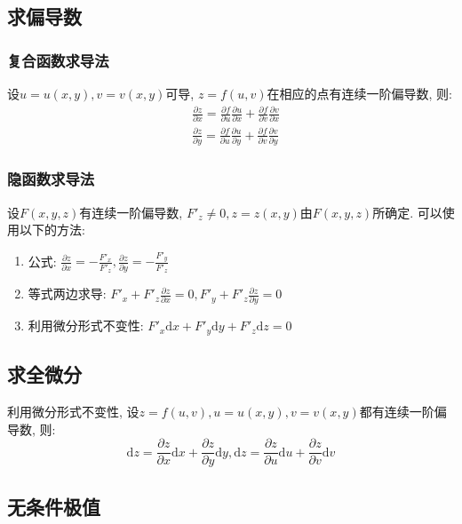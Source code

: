 \subsection{求偏导数}
\subsubsection{复合函数求导法}
设$ u=u(x,y),v=v(x,y) $可导, $ z=f(u,v) $在相应的点有连续一阶偏导数, 则:
\begin{equation*}
\begin{aligned}
& \frac{\partial z}{\partial x}=\frac{\partial f}{\partial u}\frac{\partial u}{\partial x}+\frac{\partial f}{\partial v}\frac{\partial v}{\partial x} \\
& \frac{\partial z}{\partial y}=\frac{\partial f}{\partial u}\frac{\partial u}{\partial y}+\frac{\partial f}{\partial v}\frac{\partial v}{\partial y}
\end{aligned}
\end{equation*}
\subsubsection{隐函数求导法}
设$ F(x,y,z) $有连续一阶偏导数, $ F'_{z}\neq 0, z=z(x,y) $由$ F(x,y,z) $所确定. 可以使用以下的方法:
\begin{enumerate}
\item 公式: $ \frac{\partial z}{\partial x}=-\frac{F'_{x}}{F'_{z}}, \frac{\partial z}{\partial y}=-\frac{F'_{y}}{F'_{z}} $
\item 等式两边求导: $ F'_{x}+F'_{z}\frac{\partial z}{\partial x}=0, F'_{y}+F'_{z}\frac{\partial z}{\partial y}=0 $
\item 利用微分形式不变性: $ F'_{x}\mathrm{d}x+F'_{y}\mathrm{d}y+F'_{z}\mathrm{d}z=0 $
\end{enumerate}
\subsection{求全微分}
利用微分形式不变性, 设$ z=f(u,v), u=u(x,y), v=v(x,y) $都有连续一阶偏导数, 则:
\begin{equation*}
\mathrm{d}z=\frac{\partial z}{\partial x}\mathrm{d}x+\frac{\partial z}{\partial y}\mathrm{d}y, \mathrm{d}z=\frac{\partial z}{\partial u}\mathrm{d}u+\frac{\partial z}{\partial v}\mathrm{d}v
\end{equation*}
\subsection{无条件极值}

